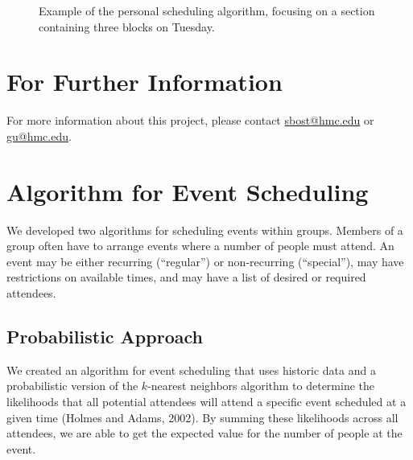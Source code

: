\documentclass[thesis]{hmcposter}
\begin{document}
\begin{poster}
\begin{figure}
{        }\qquad\qquad
  \caption[]{Example of the personal scheduling algorithm, focusing on a section containing three blocks on Tuesday.}%
  \label{fig:small-multiples}
\end{figure}



\section{For Further Information}
For more information about this project, please contact \url{sbost@hmc.edu} or \url{gu@hmc.edu}.


\section{Algorithm for Event Scheduling}
We developed two algorithms for scheduling events within groups.
Members of a group often have to arrange events where a number of people must attend.
An event may be either recurring (``regular'') or non-recurring (``special''), may have restrictions on available times, and may have a list of desired or required attendees.

\subsection{Probabilistic Approach}
We created an algorithm for event scheduling that uses historic data and a probabilistic version of the $k$-nearest neighbors algorithm to determine the likelihoods that all potential attendees will attend a specific event scheduled at a given time (Holmes and Adams, 2002).
By summing these likelihoods across all attendees, we are able to get the expected value for the number of people at the event.


\end{poster}
\end{document}
